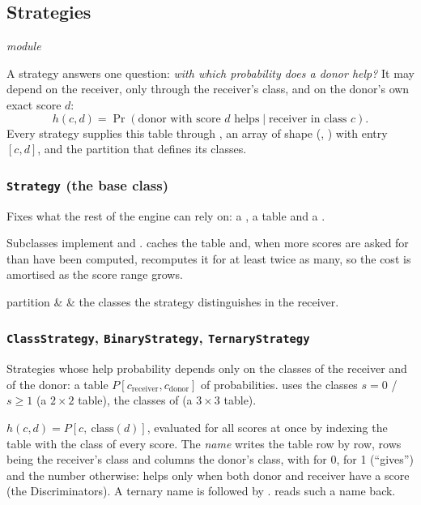 \subsection{Strategies}\label{sec:strategies}\emph{module} 

A strategy answers one question: \emph{with which probability does a donor help?}
It may depend on the receiver, only through the receiver's class, and on the donor's own exact score $d$:
\[
 h(c,d)=\Pr(\text{donor with score } d \text{ helps}\mid \text{receiver in class } c).
\]
Every strategy supplies this table through , an array of shape
(, ) with entry $[c,d]$, and the partition that defines its classes.

\subsubsection{\texttt{Strategy} (the base class)}

\whatit
Fixes what the rest of the engine can rely on: a , a  table and a .

\howit
Subclasses implement  and .  caches the table and, when more
scores are asked for than have been computed, recomputes it for at least twice as many, so the cost is amortised as the
score range grows.

\paramsh
\begin{params}
partition &  & the classes the strategy distinguishes in the receiver.\\
\end{params}

\subsubsection{\texttt{ClassStrategy}, \texttt{BinaryStrategy}, \texttt{TernaryStrategy}}

\whatit
Strategies whose help probability depends only on the classes of the receiver and of the donor: a table
$P[c_{\text{receiver}},c_{\text{donor}}]$ of probabilities.
 uses the classes $s=0$ / $s\ge1$ (a $2\times2$ table),  the classes of
 (a $3\times3$ table).

\howit
$h(c,d)=P[c,\ \text{class}(d)]$, evaluated for all scores at once by indexing the table with the class of every score.
The \emph{name} writes the table row by row, rows being the receiver's class and columns the donor's class, with
 for 0,  for 1 (``gives'') and the number otherwise:  helps only when both donor and
receiver have a score (the Discriminators). A ternary name is followed by .  reads such a
name back.


